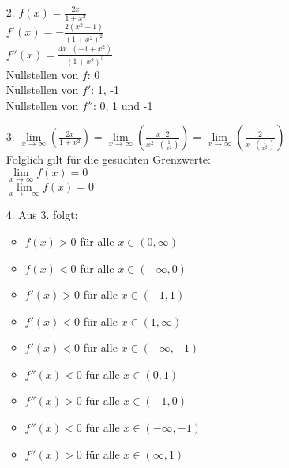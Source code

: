 \documentclass[a4paper,11pt]{scrartcl}
\newcommand{\bra}[1]{\left(#1\right)}
\newcommand{\limx}[1]{\lim\limits_{x \rightarrow \infty}\bra{#1}}
\begin{document}
\begin{enumerate}
\begin{enumerate}
            \item[2.]
                \(f(x) =  \frac{2x}{1+x^2}\) \\
                \(f'(x) =  -\frac{2(x^2-1)}{(1+x^2)^2}\) \\
                \(f''(x) =  \frac{4x \cdot (-1+x^2)}{(1+x^2)^3}\) \\
                Nullstellen von $f$: 0 \\
                Nullstellen von $f'$: 1, -1 \\
                Nullstellen von $f''$: 0, 1 und -1
            \item[3.]
                \( \limx{\frac{2x}{1+x^2}}=\limx{\frac{x \cdot 2}{x^2 \cdot (\frac{1}{x^2})}} =\limx{\frac{2}{x \cdot (\frac{1}{x^2})}} \) \\
                Folglich gilt für die gesuchten Grenzwerte: \\
                \(\lim\limits_{x \rightarrow \infty}f(x) = 0\) \\
                \(\lim\limits_{x \rightarrow -\infty}f(x) = 0\)
            \item[4.]
                Aus 3. folgt:
                \begin{multicols}{2}
                    \begin{itemize}
                        \item $f(x) > 0$ für alle $x \in (0,\infty)$
                        \item $f(x) < 0$ für alle $x \in (-\infty,0)$
                    \end{itemize}

                    \begin{itemize}
                        \item $f'(x) > 0$ für alle $x \in (-1,1)$
                        \item $f'(x) < 0$ für alle $x \in (1,\infty)$
                        \item $f'(x) < 0$ für alle $x \in (-\infty,-1)$
                    \end{itemize}

                    \begin{itemize}
                        \item $f''(x) < 0$ für alle $x \in (0,1)$
                        \item $f''(x) > 0$ für alle $x \in (-1,0)$
                        \item $f''(x) < 0$ für alle $x \in (-\infty,-1)$
                        \item $f''(x) > 0$ für alle $x \in (\infty,1)$
                    \end{itemize}
                \end{multicols}


\end{enumerate}
\end{enumerate}
\end{document}
